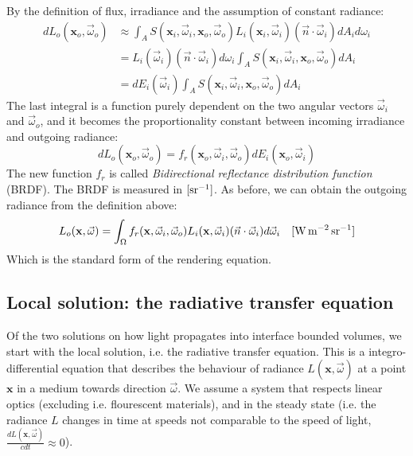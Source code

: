 By the definition of flux, irradiance and the assumption of constant radiance:
\begin{equation*}
\begin{split}
d L_o(\mathbf{x}_o, \vec{\omega}_o) &\approx \int_A S(\mathbf{x}_i, \vec{\omega}_i, \mathbf{x}_o, \vec{\omega}_o) L_i(\mathbf{x}_i, \vec{\omega}_i) (\vec{n} \cdot \vec{\omega}_i) d A_i d \omega_i  \\ &= L_i(\vec{\omega}_i) (\vec{n} \cdot \vec{\omega}_i) d \omega_i \int_A S(\mathbf{x}_i, \vec{\omega}_i, \mathbf{x}_o, \vec{\omega}_o)   d A_i \\ &= d E_i(\vec{\omega}_i) \int_A S(\mathbf{x}_i, \vec{\omega}_i, \mathbf{x}_o, \vec{\omega}_o) d A_i
\end{split}
\end{equation*}
The last integral is a function purely dependent on the two angular vectors $\vec{\omega}_i$ and $\vec{\omega}_o$, and it becomes the proportionality constant between incoming irradiance and outgoing radiance:
$$
d L_o(\mathbf{x}_o, \vec{\omega}_o) = f_r(\mathbf{x}_o, \vec{\omega}_i, \vec{\omega}_o) d E_i(\mathbf{x}_o, \vec{\omega}_i)
$$
 The new function $f_r$ is called \emph{Bidirectional reflectance distribution function} (BRDF). The BRDF is measured in $\siunitnospace{\per \steradian}$. As before, we can obtain the outgoing radiance from the definition above:
$$
L_o(\mathbf{x}, \vec{\omega}) = \int_\Omega f_r(\mathbf{x}, \vec{\omega}_i,  \vec{\omega}_o) L_i(\mathbf{x}, \vec{\omega}_i) (\vec{n} \cdot \vec{\omega}_i) d\vec{\omega}_i  \siunit{\watt \per \square \metre \per \steradian}
$$
Which is the standard form of the rendering equation.

\subsection{Local solution: the radiative transfer equation}

Of the two solutions on how light propagates into interface bounded volumes, we start with the local solution, i.e. the radiative transfer equation. This is a integro-differential equation that describes the behaviour of radiance $L(\mathbf{x}, \vec{\omega})$ at a point $\mathbf{x}$ in a medium towards direction $\vec{\omega}$. We assume a system that respects linear optics (excluding i.e. flourescent materials), and in the steady state (i.e. the radiance $L$ changes in time at speeds not comparable to the speed of light, $\frac{dL(\mathbf{x}, \vec{\omega})}{c dt} \approx 0$).

